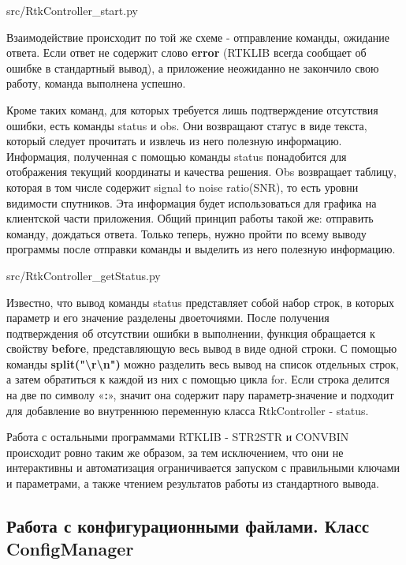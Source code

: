 
{src/RtkController_start.py}

Взаимодействие происходит по той же схеме - отправление команды, ожидание ответа. Если ответ не содержит слово \textbf{error} (RTKLIB всегда сообщает об ошибке в стандартный вывод), а приложение неожиданно не закончило свою работу, команда выполнена успешно.

Кроме таких команд, для которых требуется лишь подтверждение отсутствия ошибки, есть команды status и obs. Они возвращают статус в виде текста, который следует прочитать и извлечь из него полезную информацию. Информация, полученная с помощью команды status понадобится для отображения текущий координаты и качества решения. Obs возвращает таблицу, которая в том числе содержит signal to noise ratio(SNR), то есть уровни видимости спутников. Эта информация будет использоваться для графика на клиентской части приложения. Общий принцип работы такой же: отправить команду, дождаться ответа. Только теперь, нужно пройти по всему выводу программы после отправки команды и выделить из него полезную информацию.


{src/RtkController_getStatus.py}

Известно, что вывод команды status представляет собой набор строк, в которых параметр и его значение разделены двоеточиями. После получения подтверждения об отсутствии ошибки в выполнении, функция обращается к свойству \textbf{before}, представляющую весь вывод в виде одной строки. С помощью команды \textbf{split("\textbackslash r\textbackslash n")} можно разделить весь вывод на список отдельных строк, а затем обратиться к каждой из них с помощью цикла for. Если строка делится на две по символу «\textbf{:}», значит она содержит пару параметр-значение и подходит для добавление во внутреннюю переменную класса RtkController - status.

Работа с остальными программами RTKLIB - STR2STR и CONVBIN происходит ровно таким же образом, за тем исключением, что они не интерактивны и автоматизация ограничивается запуском с правильными ключами и параметрами, а также чтением результатов работы из стандартного вывода.

\subsection{Работа с конфигурационными файлами. Класс ConfigManager} \label{subsect3_1_2}

